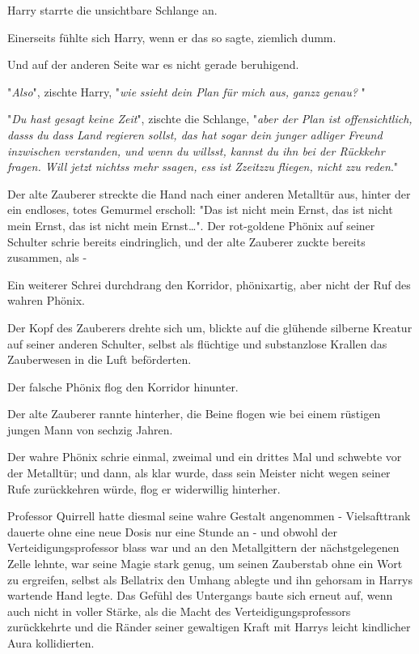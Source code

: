 {Harry starrte die unsichtbare Schlange an.

Einerseits fühlte sich Harry, wenn er das so sagte, ziemlich dumm.

Und auf der anderen Seite war es nicht gerade beruhigend.

"\emph{Also}", zischte Harry, "\emph{wie} \emph{ssieht} \emph{dein Plan für mich aus,} \emph{ganzz} \emph{genau?} "

"\emph{Du hast gesagt keine Zeit}", zischte die Schlange, "\emph{aber der Plan ist offensichtlich,} \emph{dasss} \emph{du} \emph{dass} \emph{Land regieren sollst, das hat sogar dein junger adliger Freund inzwischen verstanden, und wenn du} \emph{willsst, kannst du ihn bei der Rückkehr fragen. Will jetzt} \emph{nichtss} \emph{mehr} \emph{ssagen,} \emph{ess} \emph{ist} \emph{Zzeitzzu} \emph{fliegen, nicht} \emph{zzu} \emph{reden}."

Der alte Zauberer streckte die Hand nach einer anderen Metalltür aus, hinter der ein endloses, totes Gemurmel erscholl: "Das ist nicht mein Ernst, das ist nicht mein Ernst, das ist nicht mein Ernst…". Der rot-goldene Phönix auf seiner Schulter schrie bereits eindringlich, und der alte Zauberer zuckte bereits zusammen, als -

Ein weiterer Schrei durchdrang den Korridor, phönixartig, aber nicht der Ruf des wahren Phönix.

Der Kopf des Zauberers drehte sich um, blickte auf die glühende silberne Kreatur auf seiner anderen Schulter, selbst als flüchtige und substanzlose Krallen das Zauberwesen in die Luft beförderten.

Der falsche Phönix flog den Korridor hinunter.

Der alte Zauberer rannte hinterher, die Beine flogen wie bei einem rüstigen jungen Mann von sechzig Jahren.

Der wahre Phönix schrie einmal, zweimal und ein drittes Mal und schwebte vor der Metalltür; und dann, als klar wurde, dass sein Meister nicht wegen seiner Rufe zurückkehren würde, flog er widerwillig hinterher.

Professor Quirrell hatte diesmal seine wahre Gestalt angenommen - Vielsafttrank dauerte ohne eine neue Dosis nur eine Stunde an - und obwohl der Verteidigungsprofessor blass war und an den Metallgittern der nächstgelegenen Zelle lehnte, war seine Magie stark genug, um seinen Zauberstab ohne ein Wort zu ergreifen, selbst als Bellatrix den Umhang ablegte und ihn gehorsam in Harrys wartende Hand legte. Das Gefühl des Untergangs baute sich erneut auf, wenn auch nicht in voller Stärke, als die Macht des Verteidigungsprofessors zurückkehrte und die Ränder seiner gewaltigen Kraft mit Harrys leicht kindlicher Aura kollidierten.

}
